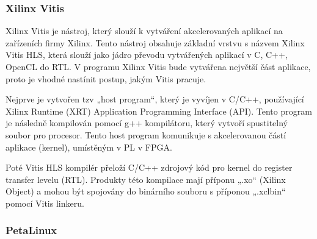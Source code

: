 \documentclass[a4paper, twoside, 11pt]{article}
\begin{document}
		\subsubsection{Xilinx Vitis}\label{subsubsec:xilinx-vitis}
		Xilinx Vitis je nástroj, který slouží k vytváření akcelerovaných aplikací na zařízeních firmy Xilinx. Tento nástroj obsahuje základní vrstvu s názvem Xilinx Vitis HLS, která slouží jako jádro převodu vytvářených aplikací v C, C++, OpenCL do RTL. V programu Xilinx Vitis bude vytvářena největší část aplikace, proto je vhodné nastínit postup, jakým Vitis pracuje.
		\par
		Nejprve je vytvořen tzv „host program“, který je vyvíjen v C/C++, používající Xilinx Runtime (XRT) Application Programming Interface (API). Tento program je následně kompilován pomocí g++ kompilátoru, který vytvoří spustitelný soubor pro procesor. Tento host program komunikuje s akcelerovanou částí aplikace (kernel), umístěným v PL v FPGA. \cite{vitis-unified-software-platform-documentation-2022}\par
		Poté Vitis HLS kompilér přeloží C/C++ zdrojový kód pro kernel do register transfer levelu (RTL). Produkty této kompilace mají příponu „.xo“ (Xilinx Object) a mohou být spojovány do binárního souboru s příponou „.xclbin“ pomocí Vitis linkeru. \cite{vitis-unified-software-platform-documentation-2022}
		\subsubsection{PetaLinux}\label{subsubsec:petalinux}
\end{document}
